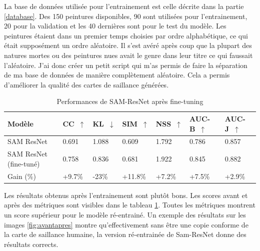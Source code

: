 \par
La base de données utilisée pour l'entrainement est celle décrite dans la partie \ref{database}. Des 150 peintures disponibles, 90 sont utilisées pour l'entrainement, 20 pour la validation et les 40 dernières sont pour le test du modèle. Les peintures étaient dans un premier temps choisies par ordre alphabétique, ce qui était supposément un ordre aléatoire. Il s'est avéré après coup que la plupart des natures mortes ou des peintures nues avait le genre dans leur titre ce qui faussait l'aléatoire. J'ai donc créer un petit script qui m'as permis de faire la séparation de ma base de données de manière complètement aléatoire. Cela a permis d'améliorer la qualité des cartes de saillance générées.

\begin{table}[ht]
    \centering
    \begin{tabular}{|l|l|l|l|l|l|l|}
        \hline
        Modèle & CC~$\uparrow$ & KL~$\downarrow$ & SIM~$\uparrow$ & NSS~$\uparrow$ & AUC-B~$\uparrow$ & AUC-J~$\uparrow$\\
        \hline
        SAM ResNet              & 0.691 & 1.088 & 0.609 & 1.792 & 0.786 & 0.857\\
        SAM ResNet (fine-tuné)  & 0.758 & 0.836 & 0.681 & 1.922 & 0.845 & 0.882\\
        \hline
        Gain (\%)               & +9.7\% & -23\% & +11.8\% & +7.2\% & +7.5\% & +2.9\%\\
        \hline
    \end{tabular}
    \caption{Performances de SAM-ResNet après fine-tuning}
    \label{tab:scoresfinetuned}
\end{table}

\par
Les résultats obtenus après l'entrainement sont plutôt bons. Les scores avant et après des métriques sont visibles dans le tableau \ref{tab:scoresfinetuned}. Toutes les métriques montrent un score supérieur pour le modèle ré-entrainé. Un exemple des résultats sur les images \ref{fig:avantapres} montre qu'effectivement sans être une copie conforme de la carte de saillance humaine, la version ré-entrainée de Sam-ResNet donne des résultats corrects.

